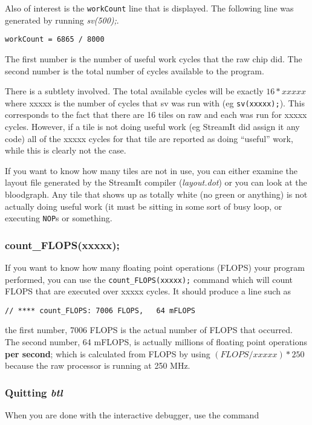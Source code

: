 \documentclass{article}
\begin{document}
Also of interest is the \texttt{workCount} line that is displayed. The
following line was generated by running \textit{sv(500);}.

\begin{verbatim}workCount = 6865 / 8000\end{verbatim}

The first number is the number of useful work cycles that the raw chip did. The second
number is the total number of cycles available to the program.

There is a subtlety involved. The total available cycles will be exactly $16*xxxxx$ where 
xxxxx is the number of cycles that sv was run with (eg \texttt{sv(xxxxx);}). This
corresponds to the fact that there are 16 tiles on raw and each was run for xxxxx cycles.
However, if a tile is not doing useful work (eg StreamIt did assign it any code)
all of the xxxxx cycles for that tile are reported as doing ``useful'' work, while this is
clearly not the case. 

If you want to know how many tiles are not in use, you can either examine the 
layout file generated by the StreamIt compiler (\textit{layout.dot}) or you
can look at the bloodgraph. Any tile that shows up as totally white (no green or anything) is
not actually doing useful work (it must be sitting in some sort of busy loop,
or executing \texttt{NOP}s or something.

\subsubsection{count\_FLOPS(xxxxx);}
If you want to know how many floating point operations (FLOPS) your 
program performed, you can use the \texttt{count\_FLOPS(xxxxx);} command which will 
count FLOPS that are executed over xxxxx cycles. It should produce a line such as

\begin{verbatim}// **** count_FLOPS: 7006 FLOPS,   64 mFLOPS\end{verbatim}

the first number, 7006 FLOPS is the actual number of FLOPS that occurred. The second
number, 64 mFLOPS, is actually millions of floating point operations \textbf{per second};
which is calculated from FLOPS by using $(FLOPS/xxxxx) * 250$ because
the raw processor is running at 250 MHz.


\subsubsection{Quitting \textit{btl}}
When you are done with the interactive debugger, use the command
\end{document}
